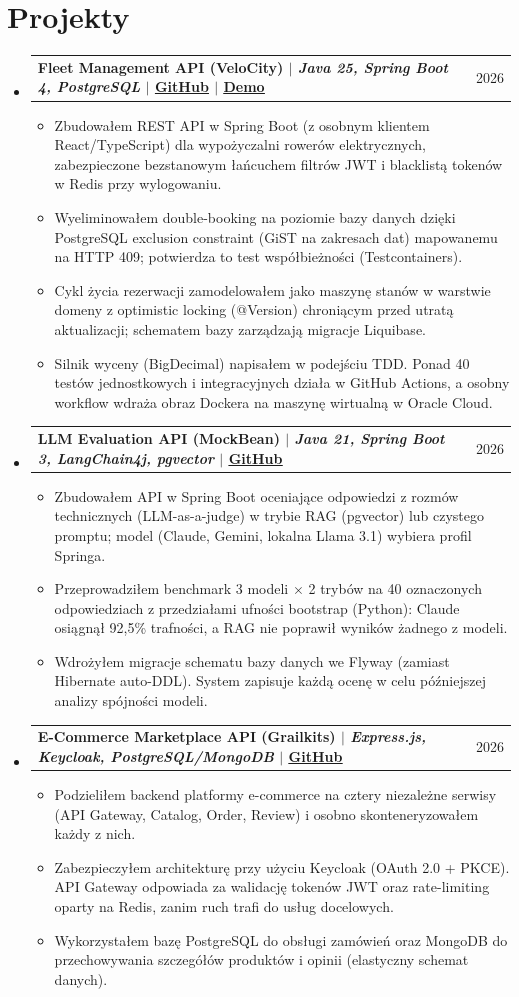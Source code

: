 \documentclass[a4paper,10pt]{article}
\makeatletter
\newcommand{\resumeItem}[1]{
  \item\small{
    {#1 \vspace{-1pt}}
  }
}
\newcommand{\resumeProjectHeading}[2]{
    \vspace{0pt}\item
    \begin{tabular*}{0.97\textwidth}{l@{\extracolsep{\fill}}r}
      \small\textbf{#1} & #2 \\
    \end{tabular*}\vspace{-3pt}
}
\newcommand{\resumeSubHeadingListStart}{\begin{itemize}[leftmargin=0.15in, label={}, topsep=0pt]}
\newcommand{\resumeSubHeadingListEnd}{\end{itemize}\vspace{0pt}}
\newcommand{\resumeItemListStart}{\begin{itemize}[itemsep=1pt, parsep=0pt, partopsep=0pt, topsep=0pt]}
\newcommand{\resumeItemListEnd}{\end{itemize}\vspace{0pt}}
\makeatother
\begin{document}
\section{Projekty}
    \resumeSubHeadingListStart
      \resumeProjectHeading
          {Fleet Management API (VeloCity) $|$ \emph{Java 25, Spring Boot 4, PostgreSQL} $|$ \href{https://github.com/jakub-jurkian/velocity-api}{\underline{GitHub}} $|$ \href{https://velocityfleet.dev}{\underline{Demo}}}
          {2026}
          \resumeItemListStart
        \resumeItem{Zbudowałem REST API w Spring Boot (z osobnym klientem React/TypeScript) dla wypożyczalni rowerów elektrycznych, zabezpieczone bezstanowym łańcuchem filtrów JWT i blacklistą tokenów w Redis przy wylogowaniu.}
        \resumeItem{Wyeliminowałem double-booking na poziomie bazy danych dzięki PostgreSQL exclusion constraint (GiST na zakresach dat) mapowanemu na HTTP 409; potwierdza to test współbieżności (Testcontainers).}
        \resumeItem{Cykl życia rezerwacji zamodelowałem jako maszynę stanów w warstwie domeny z optimistic locking (@Version) chroniącym przed utratą aktualizacji; schematem bazy zarządzają migracje Liquibase.}
        \resumeItem{Silnik wyceny (BigDecimal) napisałem w podejściu TDD. Ponad 40 testów jednostkowych i integracyjnych działa w GitHub Actions, a osobny workflow wdraża obraz Dockera na maszynę wirtualną w Oracle Cloud.}
          \resumeItemListEnd

      \resumeProjectHeading
          {LLM Evaluation API (MockBean) $|$ \emph{Java 21, Spring Boot 3, LangChain4j, pgvector} $|$ \href{https://github.com/jakub-jurkian/mockbean}{\underline{GitHub}}}
          {2026}
          \resumeItemListStart
            \resumeItem{Zbudowałem API w Spring Boot oceniające odpowiedzi z rozmów technicznych (LLM-as-a-judge) w trybie RAG (pgvector) lub czystego promptu; model (Claude, Gemini, lokalna Llama 3.1) wybiera profil Springa.}
            \resumeItem{Przeprowadziłem benchmark 3 modeli $\times$ 2 trybów na 40 oznaczonych odpowiedziach z przedziałami ufności bootstrap (Python): Claude osiągnął 92,5\% trafności, a RAG nie poprawił wyników żadnego z modeli.}
            \resumeItem{Wdrożyłem migracje schematu bazy danych we Flyway (zamiast Hibernate auto-DDL). System zapisuje każdą ocenę w celu późniejszej analizy spójności modeli.}
          \resumeItemListEnd

      \resumeProjectHeading
          {E-Commerce Marketplace API (Grailkits) $|$ \emph{Express.js, Keycloak, PostgreSQL/MongoDB} $|$ \href{https://github.com/jakub-jurkian/grailkits}{\underline{GitHub}}}
          {2026}
          \resumeItemListStart
            \resumeItem{Podzieliłem backend platformy e-commerce na cztery niezależne serwisy (API Gateway, Catalog, Order, Review) i osobno skonteneryzowałem każdy z nich.}
            \resumeItem{Zabezpieczyłem architekturę przy użyciu Keycloak (OAuth 2.0 + PKCE). API Gateway odpowiada za walidację tokenów JWT oraz rate-limiting oparty na Redis, zanim ruch trafi do usług docelowych.}
            \resumeItem{Wykorzystałem bazę PostgreSQL do obsługi zamówień oraz MongoDB do przechowywania szczegółów produktów i opinii (elastyczny schemat danych).}
          \resumeItemListEnd
    \resumeSubHeadingListEnd
\end{document}
